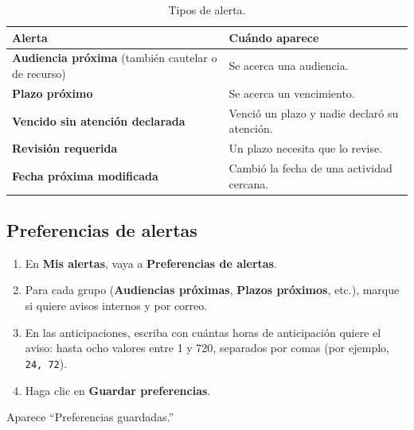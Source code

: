 \begin{table}[H]
  \centering
  \caption{Tipos de alerta.}\label{tab:tipos-alerta}
  \begin{tabularx}{\textwidth}{L{5.2cm} Y}
    \toprule
    \textbf{Alerta} & \textbf{Cuándo aparece} \\
    \midrule
    \textbf{Audiencia próxima} (también cautelar o de recurso) & Se acerca una audiencia. \\
    \textbf{Plazo próximo}                     & Se acerca un vencimiento. \\
    \textbf{Vencido sin atención declarada}    & Venció un plazo y nadie declaró su atención. \\
    \textbf{Revisión requerida}                & Un plazo necesita que lo revise. \\
    \textbf{Fecha próxima modificada}          & Cambió la fecha de una actividad cercana. \\
    \bottomrule
  \end{tabularx}
\end{table}


\subsection*{Preferencias de alertas}

\pasos
\begin{enumerate}
  \item En \textbf{Mis alertas}, vaya a \textbf{Preferencias de alertas}.
  \item Para cada grupo (\textbf{Audiencias próximas},
        \textbf{Plazos próximos}, etc.), marque si quiere avisos internos y
        por correo.
  \item En las anticipaciones, escriba con cuántas horas de anticipación
        quiere el aviso: hasta ocho valores entre 1 y 720, separados por
        comas (por ejemplo, \texttt{24, 72}).
  \item Haga clic en \textbf{Guardar preferencias}.
\end{enumerate}

\resultado Aparece \enquote{Preferencias guardadas.}

